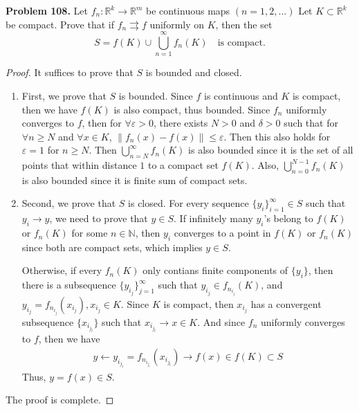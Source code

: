 \documentclass[12pt,leqno]{amsart}
\theoremstyle{definition}
\numberwithin{equation}{subsection}
\begin{document}
\noindent
{\bf Problem 108.}
Let $f_n:\mathbb{R}^k\to\mathbb{R}^m$ be continuous maps $(n=1,2,\ldots)$ Let $K\subset\mathbb{R}^k$ be compact. Prove that if $f_n\rightrightarrows f$ uniformly on $K$, then the set
$$
S=f(K)\cup\bigcup_{n=1}^\infty f_n(K)
\quad
\text{is compact.}
$$
\begin{proof}
It suffices to prove that $S$ is bounded and closed. 
\begin{enumerate}
    \item First, we prove that $S$ is bounded. Since $f$ is continuous and $K$ is compact, then we have $f(K)$ is also compact, thus bounded. Since $f_n$ uniformly converges to $f$, then for $\forall\varepsilon > 0$, there exists $N > 0$ and $\delta > 0$ such that for $\forall n \geq N$ and $\forall x\in K$, $\|f_n(x) - f(x)\| \leq \varepsilon$. Then this also holds for $\varepsilon = 1$ for $n \geq N$. Then $\bigcup^\infty_{n = N}f_n(K)$ is also bounded since it is the set of all points that within distance $1$ to a compact set $f(K)$.  Also, $\bigcup^{N-1}_{n = 0}f_n(K)$ is also bounded since it is finite sum of compact sets.
    \item Second, we prove that $S$ is closed. For every sequence $\{y_i\}^\infty_{i=1}\in S$ such that $y_i\to y$, we need to prove that $y\in S$. If infinitely many $y_i$'s belong to $f(K)$ or $f_n(K)$ for some $n\in\mathbb{N}$, then $y_i$ converges to a point in $f(K)$ or $f_n(K)$ since both are compact sets, which implies $y\in S$. 
    
    Otherwise, if every $f_n(K)$ only contians finite components of $\{y_i\}$, then there is a subsequence $\{y_{i_j}\}^\infty_{j = 1}$ such that $y_{i_j}\in f_{n_{i_j}}(K)$, and $y_{i_j} = f_{n_{i_j}}(x_{i_j}), x_{i_j}\in K$. Since $K$ is compact, then $x_{i_j}$ has a convergent subsequence $\{x_{i_{j_l}}\}$ such that $x_{i_{j_l}} \to x \in K$. And since $f_n$ uniformly converges to $f$, then we have 
    \begin{align*}
        y\leftarrow y_{i_{j_l}} = f_{n_{i_{j_l}}}\left(x_{i_{j_l}} \right) \to f(x)\in f(K) \subset S
    \end{align*}
    Thus, $y = f(x)\in S$.
\end{enumerate}

The proof is complete.
\end{proof}

\medskip
\end{document}
